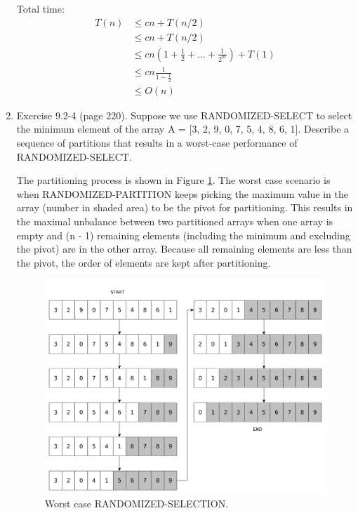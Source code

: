 \documentclass[11pts]{report}
\begin{document}
\begin{enumerate}
Total time: 
\begin{align*}
T(n) &\leq cn + T(n/2) \\
      &\leq cn + T(n/2) \\
      &\leq cn(1 + \frac{1}{2} + ... + \frac{1}{2^m}) + T(1) \\
      &\leq cn\frac{1}{1-\frac{1}{2}} \\
      &\leq O(n)
\end{align*}

\item Exercise 9.2-4 (page 220). Suppose we use RANDOMIZED-SELECT to select the minimum element of the array A = [3, 2, 9, 0, 7, 5, 4, 8, 6, 1]. Describe a sequence of partitions that results in a worst-case performance of RANDOMIZED-SELECT.

The partitioning process is shown in Figure \ref{Fig:3a}. The worst case scenario is when RANDOMIZED-PARTITION keeps picking the maximum value in the array (number in shaded area) to be the pivot for partitioning. This results in the maximal unbalance between two partitioned arrays when one array is empty and (n - 1) remaining elements (including the minimum and excluding the pivot) are in the other array. Because all remaining elements are less than the pivot, the order of elements are kept after partitioning.

\begin{figure}[h]
\begin{center}
\includegraphics[scale=0.3]{5.pdf}
\caption{Worst case RANDOMIZED-SELECTION.}
\label{Fig:3a}
\end{center}
\end{figure}


\end{enumerate}
\end{document}
